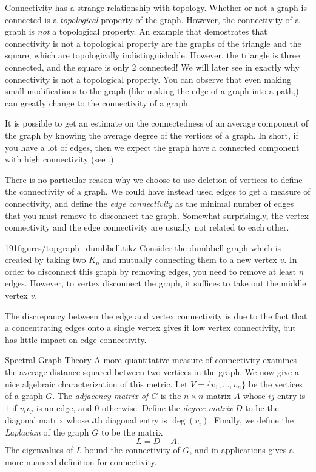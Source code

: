 Connectivity has a strange relationship with topology.
Whether or not a graph is connected is a \emph{topological} property of the graph. However, the connectivity of a graph is \emph{not} a topological property.
An example that demostrates that connectivity is not a topological property are the graphs of the triangle and the square, which are topologically indistinguishable.
However, the triangle is three connected, and the square is only 2 connected! We will later see in  exactly why connectivity is not a topological property. 
You can observe that even making small modifications to the graph (like making the edge of a graph into a path,) can greatly change to the connectivity of a graph. 

It is possible to get an estimate on the connectedness of an average component of the graph by knowing the average degree of the vertices of a graph.
In short, if you have a lot of edges, then we expect the graph have a connected component with high connectivity (see .)



There is no particular reason why we choose to use deletion of vertices to define the connectivity of a graph. 
We could have instead used edges to get a measure of connectivity, and define the \emph{edge connectivity} as the minimal number of edges that you must remove to disconnect the graph.
Somewhat surprisingly, the vertex connectivity and the edge connectivity are usually not related to each other.
\begin{examplefigureenv}{191figures/topgraph_dumbbell.tikz}
Consider the dumbbell graph which is created by taking two $K_n$ and mutually connecting them to a new vertex $v$. 
In order to disconnect this graph by removing edges, you need to remove at least $n$ edges.
However, to vertex disconnect the graph, it suffices to take out the middle vertex $v$.
\label{fig:graph:dumbell}
\end{examplefigureenv}
The discrepancy between the edge and vertex connectivity is due to the fact that a concentrating edges onto a single vertex gives it low vertex connectivity, but has little impact on edge connectivity.


\begin{projectdescription}{Spectral Graph Theory}
A more quantitative measure of connectivity examines the average distance squared between two vertices in the graph.\label{proj:spectral}
We now give a nice algebraic characterization of this metric. 
Let  $V=\{v_1, \ldots, v_n\}$ be the vertices of a graph $G$. 
The \emph{adjacency matrix of $G$}  is the $n\times n$ matrix $A$ whose $ij$ entry is $1$ if $v_iv_j$ is an edge, and $0$ otherwise.
Define the \emph{degree matrix} $D$ to be the diagonal matrix whose $i$th diagonal entry  is $\deg(v_i)$.
Finally, we define the \emph{Laplacian} of the graph $G$ to be the matrix 
\[
	L=D-A.
\]
The eigenvalues of $L$ bound the connectivity of $G$, and in applications gives a more nuanced definition for connectivity.
\end{projectdescription}

